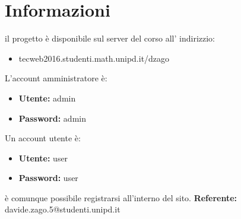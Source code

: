\section{Informazioni}
il progetto è disponibile sul server del corso all' indirizzio: 
\begin{itemize}
	\item tecweb2016.studenti.math.unipd.it/dzago
\end{itemize}
L'account amministratore è:
\begin{itemize}
    \item \textbf{Utente:} admin
    \item \textbf{Password:} admin	
\end{itemize}
Un account utente è:
\begin{itemize}
	\item \textbf{Utente:} user
	\item \textbf{Password:} user
\end{itemize}
è comunque possibile registrarsi all'interno del sito.\newline
\textbf{Referente:} davide.zago.5@studenti.unipd.it
